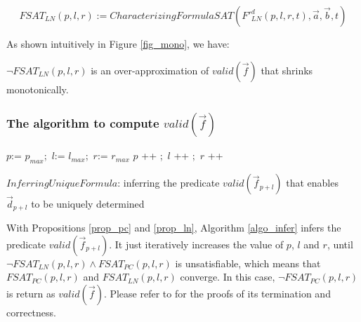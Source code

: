 \documentclass[runningheads,a4paper,orivec]{llncs}
\begin{document}
\begin{equation}\label{fsat_ln}
FSAT_{LN}(p,l,r):=CharacterizingFormulaSAT(F'^d_{LN}(p,l,r,t),\vec{a},\vec{b},t)
\end{equation}

As shown intuitively in Figure \ref{fig_mono},
we have:

\begin{proposition}\label{prop_ln}
$\neg FSAT_{LN}(p,l,r)$ is an over-approximation of $valid(\vec{f})$ that shrinks monotonically.
\end{proposition}




\subsubsection{The algorithm to compute $valid(\vec{f})$}\label{subsub_overal}
\begin{algorithm}[t]
\SetAlgoVlined
$p$:= $p_{max}$;~$l$:= $l_{max}$;~$r$:= $r_{max}$ \;
 {
  $p$ ++ ;~$l$ ++ ;~$r$ ++ \;
}
\caption{$InferringUniqueFormula$: inferring the predicate $valid(\vec{f}_{p+l})$ 
that enables $\vec{d}_{p+l}$ to be uniquely determined}
\label{algo_infer}
\end{algorithm}

With Propositions \ref{prop_pc} and \ref{prop_ln},
Algorithm \ref{algo_infer} infers the predicate $valid(\vec{f}_{p+l})$.
It just iteratively increases the value of $p$, $l$ and $r$, 
until $\neg FSAT_{LN}(p,l,r)\wedge FSAT_{PC}(p,l,r)$ is unsatisfiable,
which means that $FSAT_{PC}(p,l,r)$ and $FSAT_{LN}(p,l,r)$ converge.
In this case,
$\neg FSAT_{PC}(p,l,r)$ is return as $valid(\vec{f})$.
Please refer to \cite{QinTODAES15} for the proofs of its termination and correctness.
\end{document}
